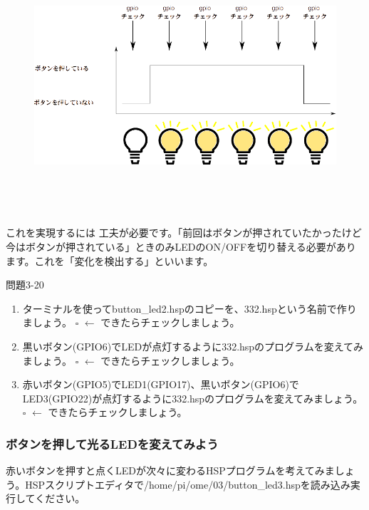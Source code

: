\documentclass[a4paper,dvipdfmx]{jarticle}
\begin{document}
\begin{figure}
\centering
\includegraphics[width=17.006cm,height=9.495cm]{text03-img/text03-img033.png}
\end{figure}
これを実現するには
工夫が必要です。「前回はボタンが押されていたかったけど今はボタンが押されている」ときのみLEDのON/OFFを切り替える必要があります。これを「変化を検出する」といいます。

{\ttfamily
問題3-20}

\begin{enumerate}
\item
ターミナルを使ってbutton\_led2.hspのコピーを、332.hspという名前で作りましょう。\newline
${\square}$ $\leftarrow $
できたらチェックしましょう。
\item
黒いボタン(GPIO6)でLEDが点灯するように332.hspのプログラムを変えてみましょう。\newline
${\square}$ $\leftarrow $
できたらチェックしましょう。
\item
赤いボタン(GPIO5)でLED1(GPIO17)、黒いボタン(GPIO6)でLED3(GPIO22)が点灯するように332.hspのプログラムを変えてみましょう。\newline
${\square}$ $\leftarrow $
できたらチェックしましょう。
\end{enumerate}
\subsubsection{}
\subsubsection{}
\clearpage\subsubsection{ボタンを押して光るLEDを変えてみよう}
赤いボタンを押すと点くLEDが次々に変わるHSPプログラムを考えてみましょう。HSPスクリプトエディタで/home/pi/ome/03/button\_led3.hspを読み込み実行してください。
\end{document}
